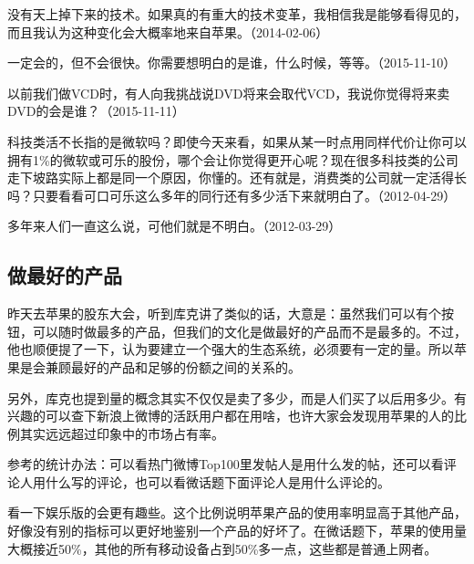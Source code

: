 没有天上掉下来的技术。如果真的有重大的技术变革，我相信我是能够看得见的，而且我认为这种变化会大概率地来自苹果。（2014-02-06）


一定会的，但不会很快。你需要想明白的是谁，什么时候，等等。（2015-11-10）


以前我们做VCD时，有人向我挑战说DVD将来会取代VCD，我说你觉得将来卖DVD的会是谁？（2015-11-11）


科技类活不长指的是微软吗？即使今天来看，如果从某一时点用同样代价让你可以拥有1\%的微软或可乐的股份，哪个会让你觉得更开心呢？现在很多科技类的公司走下坡路实际上都是同一个原因，你懂的。还有就是，消费类的公司就一定活得长吗？只要看看可口可乐这么多年的同行还有多少活下来就明白了。（2012-04-29）


多年来人们一直这么说，可他们就是不明白。（2012-03-29）

\subsection{做最好的产品}

昨天去苹果的股东大会，听到库克讲了类似的话，大意是：虽然我们可以有个按钮，可以随时做最多的产品，但我们的文化是做最好的产品而不是最多的。不过，他也顺便提了一下，认为要建立一个强大的生态系统，必须要有一定的量。所以苹果是会兼顾最好的产品和足够的份额之间的关系的。

另外，库克也提到量的概念其实不仅仅是卖了多少，而是人们买了以后用多少。有兴趣的可以查下新浪上微博的活跃用户都在用啥，也许大家会发现用苹果的人的比例其实远远超过印象中的市场占有率。

参考的统计办法：可以看热门微博Top100里发帖人是用什么发的帖，还可以看评论人用什么写的评论，也可以看微话题下面评论人是用什么评论的。


看一下娱乐版的会更有趣些。这个比例说明苹果产品的使用率明显高于其他产品，好像没有别的指标可以更好地鉴别一个产品的好坏了。在微话题下，苹果的使用量大概接近50\%，其他的所有移动设备占到50\%多一点，这些都是普通上网者。

